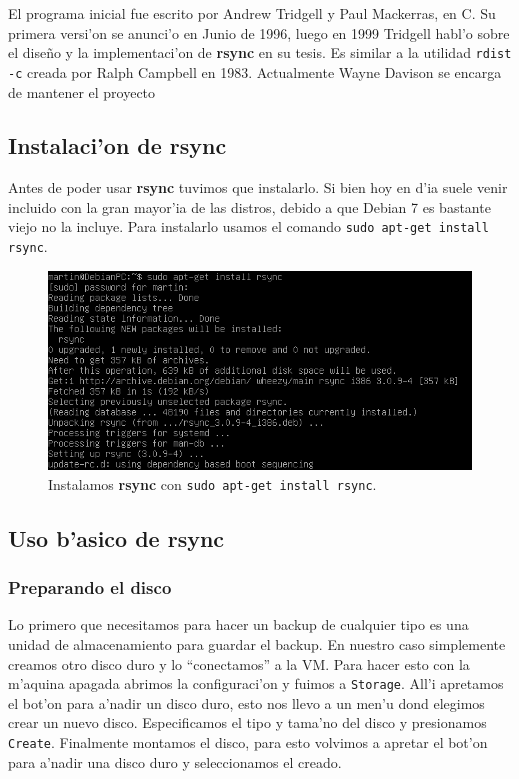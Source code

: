 \documentclass[11pt]{article}
\newcommand{\rsync}[0]{\textbf{rsync}}
\begin{document}
		El programa inicial fue escrito por Andrew Tridgell y Paul Mackerras, en C. Su primera versi'on se anunci'o en Junio de 1996, luego en 1999 Tridgell habl'o sobre el diseño y la implementaci'on de \rsync{} en su tesis. Es similar a la utilidad \texttt{rdist -c} creada por Ralph Campbell en 1983. Actualmente Wayne Davison se encarga de mantener el proyecto

	\subsection{Instalaci'on de rsync}
		Antes de poder usar \rsync{} tuvimos que instalarlo. Si bien hoy en d'ia suele venir incluido con la gran mayor'ia de las distros, debido a que Debian 7 es bastante viejo no la incluye. Para instalarlo usamos el comando \texttt{sudo apt-get install rsync}.

		\begin{figure}[H]
    			\centering
    			\includegraphics[scale=0.7]{Images/rsync/rsync_install.PNG}
    			\caption{Instalamos \rsync{} con \texttt{sudo apt-get install rsync}.}
    			\label{fig:rsync_install}
		\end{figure}

	\subsection{Uso b'asico de rsync}
	\subsubsection{Preparando el disco}
		Lo primero que necesitamos para hacer un backup de cualquier tipo es una unidad de almacenamiento para guardar el backup. En nuestro caso simplemente creamos otro disco duro y lo ``conectamos'' a la VM. Para hacer esto con la m'aquina apagada abrimos la configuraci'on y fuimos a \texttt{Storage}. All'i apretamos el bot'on para a'nadir un disco duro, esto nos llevo a un men'u  dond elegimos crear un nuevo disco. Especificamos el tipo y tama'no del disco y presionamos \texttt{Create}. Finalmente montamos el disco, para esto volvimos a apretar el bot'on para a'nadir una disco duro y seleccionamos el creado.
\end{document}

